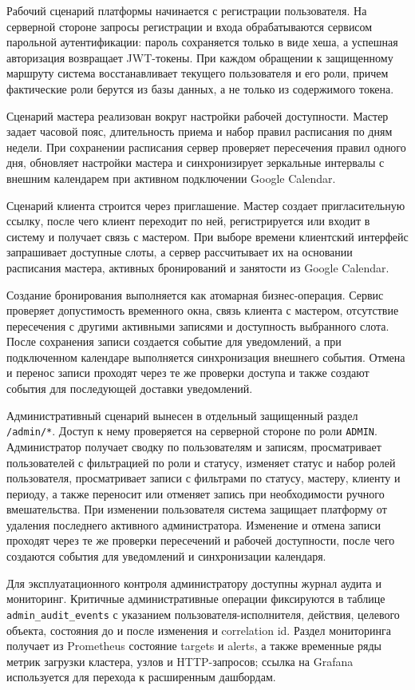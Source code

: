 Рабочий сценарий платформы начинается с регистрации пользователя. На серверной стороне запросы регистрации и входа обрабатываются сервисом парольной аутентификации: пароль сохраняется только в виде хеша, а успешная авторизация возвращает JWT-токены. При каждом обращении к защищенному маршруту система восстанавливает текущего пользователя и его роли, причем фактические роли берутся из базы данных, а не только из содержимого токена.

Сценарий мастера реализован вокруг настройки рабочей доступности. Мастер задает часовой пояс, длительность приема и набор правил расписания по дням недели. При сохранении расписания сервер проверяет пересечения правил одного дня, обновляет настройки мастера и синхронизирует зеркальные интервалы с внешним календарем при активном подключении Google Calendar.

Сценарий клиента строится через приглашение. Мастер создает пригласительную ссылку, после чего клиент переходит по ней, регистрируется или входит в систему и получает связь с мастером. При выборе времени клиентский интерфейс запрашивает доступные слоты, а сервер рассчитывает их на основании расписания мастера, активных бронирований и занятости из Google Calendar.

Создание бронирования выполняется как атомарная бизнес-операция. Сервис проверяет допустимость временного окна, связь клиента с мастером, отсутствие пересечения с другими активными записями и доступность выбранного слота. После сохранения записи создается событие для уведомлений, а при подключенном календаре выполняется синхронизация внешнего события. Отмена и перенос записи проходят через те же проверки доступа и также создают события для последующей доставки уведомлений.

Административный сценарий вынесен в отдельный защищенный раздел \texttt{/admin/*}. Доступ к нему проверяется на серверной стороне по роли \texttt{ADMIN}. Администратор получает сводку по пользователям и записям, просматривает пользователей с фильтрацией по роли и статусу, изменяет статус и набор ролей пользователя, просматривает записи с фильтрами по статусу, мастеру, клиенту и периоду, а также переносит или отменяет запись при необходимости ручного вмешательства. При изменении пользователя система защищает платформу от удаления последнего активного администратора. Изменение и отмена записи проходят через те же проверки пересечений и рабочей доступности, после чего создаются события для уведомлений и синхронизации календаря.

Для эксплуатационного контроля администратору доступны журнал аудита и мониторинг. Критичные административные операции фиксируются в таблице \texttt{admin\_audit\_events} с указанием пользователя-исполнителя, действия, целевого объекта, состояния до и после изменения и correlation id. Раздел мониторинга получает из Prometheus состояние targets и alerts, а также временные ряды метрик загрузки кластера, узлов и HTTP-запросов; ссылка на Grafana используется для перехода к расширенным дашбордам.

